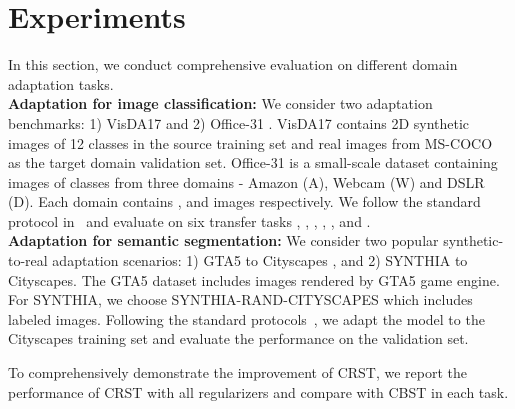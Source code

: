 \documentclass[10pt,twocolumn,letterpaper]{article}
\theoremstyle{plain}
\begin{document}
\section{Experiments}\label{sec:exp}
In this section, we conduct comprehensive evaluation on different domain adaptation tasks.\\
\noindent\textbf{Adaptation for image classification:} We consider two adaptation benchmarks: 1) VisDA17 \cite{peng2018visda} and 2) Office-31 \cite{saenko2010adapting}. VisDA17 contains  2D synthetic images of 12 classes in the source training set and  real images from MS-COCO~\cite{lin2014microsoft} as the target domain validation set. Office-31 is a small-scale dataset containing images of  classes from three domains - Amazon (A), Webcam (W) and DSLR (D). Each domain contains ,  and  images respectively. We follow the standard protocol in~\cite{saenko2010adapting,sankaranarayanan2018generate} and evaluate on six transfer tasks , , , , , and .\\
\noindent\textbf{Adaptation for semantic segmentation:} We consider two popular synthetic-to-real adaptation scenarios: 1) GTA5 \cite{richter2016playing} to Cityscapes \cite{cordts2016cityscapes}, and
2) SYNTHIA \cite{ros2016synthia} to Cityscapes. The GTA5 dataset includes  images rendered by GTA5 game engine. For SYNTHIA, we choose
SYNTHIA-RAND-CITYSCAPES which includes  labeled images. Following the standard protocols~\cite{hoffman2018cycada,Tsai_adaptseg_2018}, we adapt the model to the Cityscapes training set and evaluate the performance on the validation set.

To comprehensively demonstrate the improvement of CRST, we report the performance of CRST with all regularizers and compare with CBST in each task.
\end{document}
